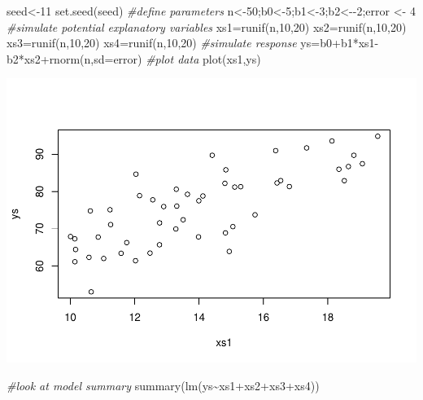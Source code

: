 \documentclass[
]{book}
\newenvironment{Shaded}{\begin{snugshade}}{\end{snugshade}}
\newcommand{\AttributeTok}[1]{\textcolor[rgb]{0.77,0.63,0.00}{#1}}
\newcommand{\CommentTok}[1]{\textcolor[rgb]{0.56,0.35,0.01}{\textit{#1}}}
\newcommand{\DecValTok}[1]{\textcolor[rgb]{0.00,0.00,0.81}{#1}}
\newcommand{\FunctionTok}[1]{\textcolor[rgb]{0.00,0.00,0.00}{#1}}
\newcommand{\NormalTok}[1]{#1}
\newcommand{\OtherTok}[1]{\textcolor[rgb]{0.56,0.35,0.01}{#1}}
\newcommand{\SpecialCharTok}[1]{\textcolor[rgb]{0.00,0.00,0.00}{#1}}
\begin{document}
\begin{Shaded}
\begin{Highlighting}[]
\NormalTok{seed}\OtherTok{\textless{}{-}}\DecValTok{11}
\FunctionTok{set.seed}\NormalTok{(seed)}
\CommentTok{\#define parameters}
\NormalTok{n}\OtherTok{\textless{}{-}}\DecValTok{50}\NormalTok{;b0}\OtherTok{\textless{}{-}}\DecValTok{5}\NormalTok{;b1}\OtherTok{\textless{}{-}}\DecValTok{3}\NormalTok{;b2}\OtherTok{\textless{}{-}}\SpecialCharTok{{-}}\DecValTok{2}\NormalTok{;error }\OtherTok{\textless{}{-}} \DecValTok{4}
\CommentTok{\#simulate potential explanatory variables}
\NormalTok{xs1}\OtherTok{=}\FunctionTok{runif}\NormalTok{(n,}\DecValTok{10}\NormalTok{,}\DecValTok{20}\NormalTok{)}
\NormalTok{xs2}\OtherTok{=}\FunctionTok{runif}\NormalTok{(n,}\DecValTok{10}\NormalTok{,}\DecValTok{20}\NormalTok{)}
\NormalTok{xs3}\OtherTok{=}\FunctionTok{runif}\NormalTok{(n,}\DecValTok{10}\NormalTok{,}\DecValTok{20}\NormalTok{)}
\NormalTok{xs4}\OtherTok{=}\FunctionTok{runif}\NormalTok{(n,}\DecValTok{10}\NormalTok{,}\DecValTok{20}\NormalTok{)}
\CommentTok{\#simulate response}
\NormalTok{ys}\OtherTok{=}\NormalTok{b0}\SpecialCharTok{+}\NormalTok{b1}\SpecialCharTok{*}\NormalTok{xs1}\SpecialCharTok{{-}}\NormalTok{b2}\SpecialCharTok{*}\NormalTok{xs2}\SpecialCharTok{+}\FunctionTok{rnorm}\NormalTok{(n,}\AttributeTok{sd=}\NormalTok{error)}
\CommentTok{\#plot data}
\FunctionTok{plot}\NormalTok{(xs1,ys)}
\end{Highlighting}
\end{Shaded}

\includegraphics{ECOMODbook_files/figure-latex/a7.4-1.pdf}

\begin{Shaded}
\begin{Highlighting}[]
\CommentTok{\#look at model summary}
\FunctionTok{summary}\NormalTok{(}\FunctionTok{lm}\NormalTok{(ys}\SpecialCharTok{\textasciitilde{}}\NormalTok{xs1}\SpecialCharTok{+}\NormalTok{xs2}\SpecialCharTok{+}\NormalTok{xs3}\SpecialCharTok{+}\NormalTok{xs4))}
\end{Highlighting}
\end{Shaded}
\end{document}
